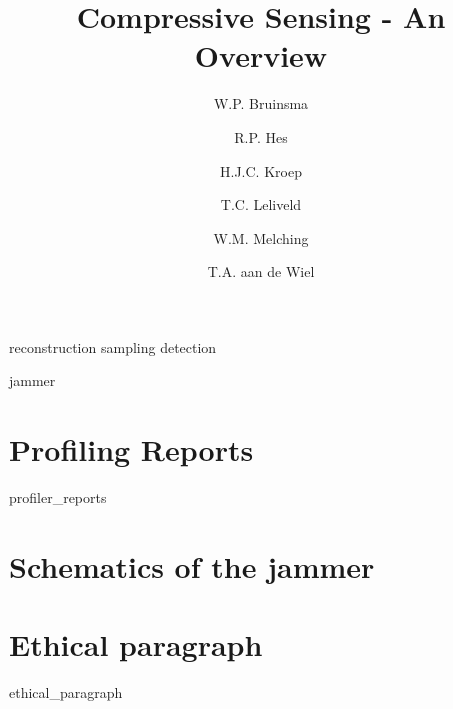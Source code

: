 \documentclass[a4paper, openany, oneside]{memoir}
\title{Compressive Sensing - An Overview}
\author{W.P. Bruinsma \and R.P. Hes \and H.J.C. Kroep \and T.C. Leliveld \and W.M. Melching \and T.A. aan de Wiel}
\begin{document}
\appendix

{reconstruction}
{sampling}
{detection}

{jammer}

\chapter{Profiling Reports}
\label{ap:prof}
{profiler_reports}

\chapter{Schematics of the jammer}
\label{ap:jammer}


\chapter{Ethical paragraph}
\label{ap:ethical}
{ethical_paragraph}
\end{document}
